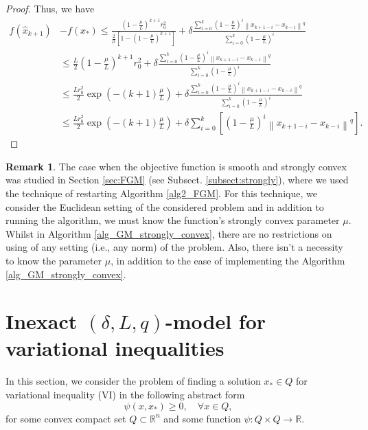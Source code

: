 \documentclass[11pt]{amsart}
\theoremstyle{definition}
\newtheorem{remark}[theorem]{Remark}
\numberwithin{equation}{section}
\begin{document}
\begin{proof}
Thus, we have 
\begin{align}
    f\left(\widehat{x}_{k+1}\right) & - f(x_*) \nonumber
    \leq   \frac{\left( 1 - \frac{\mu}{L}\right)^{k+1} r_{0}^2 }{\frac{2}{\mu} \left[ 1 -\left(1- \frac{\mu}{L}\right)^{k+1} \right]}
    +  \delta \frac{ \sum_{i = 0}^{k} \left(1- \frac{\mu}{L}\right)^i \left\|x_{k+1-i} - x_{k-i}\right \|^q }{ \sum_{i = 0}^{k} \left(1- \frac{\mu}{L}\right)^i} \nonumber
    \\& \leq \frac{L}{2}  \left( 1 - \frac{\mu}{L}\right)^{k+1} r_{0}^2 
    +  \delta \frac{ \sum_{i = 0}^{k} \left(1- \frac{\mu}{L}\right)^i \left\|x_{k+1-i} - x_{k-i}\right \|^q }{ \sum_{i = 0}^{k} \left(1- \frac{\mu}{L}\right)^i} \nonumber
    \\& \leq \frac{Lr_0^2}{2} \exp\left(- (k+1) \frac{\mu}{L}\right) +  \delta \frac{ \sum_{i = 0}^{k} \left(1- \frac{\mu}{L}\right)^i \left\|x_{k+1-i} - x_{k-i}\right \|^q }{ \sum_{i = 0}^{k} \left(1- \frac{\mu}{L}\right)^i}
    \label{eq_erty}
    \\& \leq \frac{L r_0^2}{2} \exp \left(- (k+1) \frac{\mu}{L}\right) + \delta \sum_{ i = 0}^{k} \left[\left(1 - \frac{\mu}{L}\right)^i \left \|x_{k+1 - i} - x_{k - i}\right\|^q\right]. \nonumber
\end{align}
\end{proof}

\begin{remark}
The case when the objective function is smooth and strongly convex was studied in Section \ref{sec:FGM} (see Subsect. \ref{subsect:strongly}), where we used the technique of restarting Algorithm \ref{alg2_FGM}. For this technique, we consider the Euclidean setting of the considered problem and in addition to running the algorithm, we must know the function's strongly convex parameter $\mu$.  Whilst in Algorithm \ref{alg_GM_strongly_convex}, there are no restrictions on using of any setting (i.e., any norm) of the problem. Also, there isn't a necessity to know the parameter $\mu$, in addition to the ease of implementing the Algorithm \ref{alg_GM_strongly_convex}. 
\end{remark}

\section{Inexact $(\delta, L, q)$-model for variational inequalities}\label{Sect:VI}

In this section, we consider the problem of finding a solution $x_* \in Q$ for variational inequality (VI) in the following abstract form \cite{Stonyakin2021OMS}
\begin{equation}\label{VI_prob_1}
    \psi(x, x_*) \geq 0, \quad \forall x \in Q,
\end{equation}
for some convex compact set $Q \subset \mathbb{R}^n$ and some function $\psi: Q \times Q \longrightarrow \mathbb{R}$. 
\end{document}

